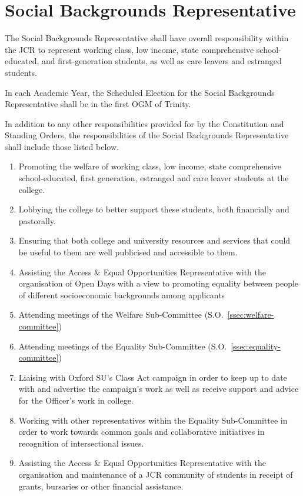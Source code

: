 \section{Social Backgrounds Representative}
\npara	The Social Backgrounds Representative shall have overall responsibility within the JCR to represent working class, low income, state comprehensive school-educated, and first-generation students, as well as care leavers and estranged students.

\npara In each Academic Year, the Scheduled Election for the Social Backgrounds Representative shall be in the first OGM of Trinity.

\npara	In addition to any other responsibilities provided for by the Constitution and Standing Orders, the responsibilities of the Social Backgrounds Representative shall include those listed below. 
\begin{enumerate}
    \item Promoting the welfare of working class, low income, state comprehensive school-educated, first generation, estranged and care leaver students at the college.
    \item Lobbying the college to better support these students, both financially and pastorally.
    \item Ensuring that both college and university resources and services that could be useful to them are well publicised and accessible to them.
    \item Assisting the Access \& Equal Opportunities Representative with the organisation of Open Days with a view to promoting equality between people of different socioeconomic backgrounds among applicants
    \item Attending meetings of the Welfare Sub-Committee (S.O.~\ref{ssec:welfare-committee})
    \item Attending meetings of the Equality Sub-Committee (S.O.~\ref{ssec:equality-committee})
    \item Liaising with Oxford SU’s Class Act campaign in order to keep up to date with and advertise the campaign’s work as well as receive support and advice for the Officer’s work in college.
    \item Working with other representatives within the Equality Sub-Committee in order to work towards common goals and collaborative initiatives in recognition of intersectional issues.
    \item Assisting the Access \& Equal Opportunities Representative with the organisation and maintenance of a JCR community of students in receipt of grants, bursaries or other financial assistance.
\end{enumerate}

